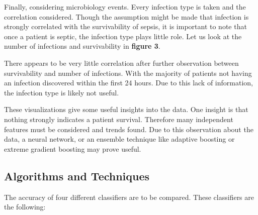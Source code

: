 \documentclass[11pt]{article}
\begin{document}
	Finally, considering microbiology events. Every infection type is taken and the correlation considered. Though the assumption might be made that infection is strongly correlated with the survivability of sepsis, it is important to note that once a patient is septic, the infection type plays little role. Let us look at the number of infections and survivability in \textbf{figure 3}.
	
	There appears to be very little correlation after further observation between survivability and number of infections. With the majority of patients not having an infection discovered within the first 24 hours. Due to this lack of information, the infection type is likely not useful. 
	
	These visualizations give some useful insights into the data. One insight is that nothing strongly indicates a patient survival. Therefore many independent features must be considered and trends found. Due to this observation about the data, a neural network, or an ensemble technique like adaptive boosting or extreme gradient boosting may prove useful. 
	
	
	\subsection{Algorithms and Techniques}
	The accuracy of four different classifiers are to be compared. These classifiers are the following:
	
\end{document}
